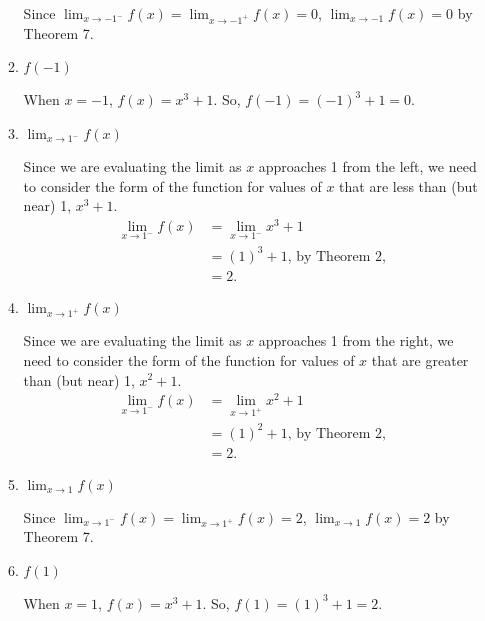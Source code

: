 \begin{enumerate}
\begin{enumerate}
Since $\displaystyle{\lim_{x \rightarrow -1^-} f(x) = \lim_{x \rightarrow -1^+} f(x) = 0}$, $\displaystyle{\lim_{x \rightarrow -1} f(x) = 0}$ by Theorem 7.

\bigskip

\item $f(-1)$

When $x = -1$, $f(x) = x^3 + 1$.  So, $f(-1) = (-1)^3 + 1 = 0$.

\bigskip

\item $\displaystyle{\lim_{x \rightarrow 1^-} f(x)}$

Since we are evaluating the limit as $x$ approaches 1 from the left, we need to consider the form of the function for values of $x$ that are less than (but near) 1, $x^3 + 1$.
\begin{align*}
\lim_{x \rightarrow 1^-} f(x) & = \lim_{x \rightarrow 1^-} x^3 + 1\\
& = (1)^3 + 1 \text{, by Theorem 2,}\\
& = 2.
\end{align*}

\bigskip

\item $\displaystyle{\lim_{x \rightarrow 1^+} f(x)}$

Since we are evaluating the limit as $x$ approaches 1 from the right, we need to consider the form of the function for values of $x$ that are greater than (but near) 1, $x^2 + 1$.
\begin{align*}
\lim_{x \rightarrow 1^-} f(x) & = \lim_{x \rightarrow 1^+} x^2 + 1\\
& = (1)^2 + 1 \text{, by Theorem 2,}\\
& = 2.
\end{align*}

\bigskip

\item $\displaystyle{\lim_{x \rightarrow 1} f(x)}$

Since $\displaystyle{\lim_{x \rightarrow 1^-} f(x) = \lim_{x \rightarrow 1^+} f(x) = 2}$, $\displaystyle{\lim_{x \rightarrow 1} f(x) = 2}$ by Theorem 7.

\bigskip

\item $f(1)$

When $x = 1$, $f(x) = x^3 + 1$.  So, $f(1) = (1)^3 + 1 = 2$.

\end{enumerate}

\vfill %


\end{enumerate}
